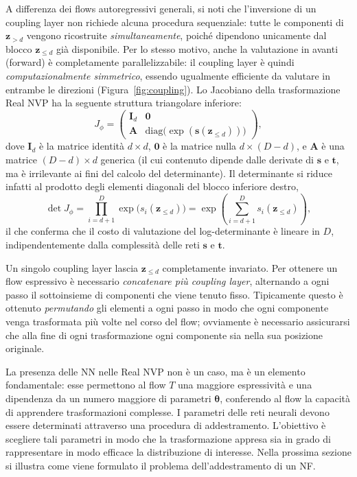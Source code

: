 A differenza dei flows autoregressivi generali, si noti che l'inversione di un coupling layer non richiede alcuna procedura sequenziale: tutte le componenti di $\mathbf{z}_{>d}$ vengono ricostruite \emph{simultaneamente}, poiché dipendono unicamente dal blocco $\mathbf{z}_{\leq d}$ già disponibile. Per lo stesso motivo, anche la valutazione in avanti (forward) è completamente parallelizzabile: il coupling layer è quindi \emph{computazionalmente simmetrico}, essendo ugualmente efficiente da valutare in entrambe le direzioni (Figura~\ref{fig:coupling}).
Lo Jacobiano della trasformazione Real NVP ha la seguente struttura triangolare inferiore:
\begin{equation}
    J_{\phi} =
    \begin{pmatrix}
        \mathbf{I}_d & \mathbf{0} \\
        \mathbf{A} & \mathrm{diag}\big(\exp(\mathbf{s}(\mathbf{z}_{\leq d}))\big)
    \end{pmatrix},
    \label{eq:coupling_jacobian}
\end{equation}
dove $\mathbf{I}_d$ è la matrice identità $d \times d$, $\mathbf{0}$ è la matrice nulla $d \times (D-d)$, e $\mathbf{A}$ è una matrice $(D-d) \times d$ generica (il cui contenuto dipende dalle derivate di $\mathbf{s}$ e $\mathbf{t}$, ma è irrilevante ai fini del calcolo del determinante). Il determinante si riduce infatti al prodotto degli elementi diagonali del blocco inferiore destro,
\begin{equation}
    \det J_{\phi} = \prod_{i=d+1}^{D} \exp\big(s_i(\mathbf{z}_{\leq d})\big) = \exp\left(\sum_{i=d+1}^{D} s_i(\mathbf{z}_{\leq d})\right),
\end{equation}
il che conferma che il costo di valutazione del log-determinante è lineare in $D$, indipendentemente dalla complessità delle reti $\mathbf{s}$ e $\mathbf{t}$.

Un singolo coupling layer lascia $\mathbf{z}_{\leq d}$ completamente invariato. Per ottenere un flow espressivo è necessario \emph{concatenare più coupling layer}, alternando a ogni passo il sottoinsieme di componenti che viene tenuto fisso. Tipicamente questo è ottenuto \emph{permutando} gli elementi a ogni passo in modo che ogni componente venga trasformata più volte nel corso del flow; ovviamente è necessario assicurarsi che alla fine di ogni trasformazione ogni componente sia nella sua posizione originale.

La presenza delle NN nelle Real NVP non è un caso, ma è un elemento fondamentale: esse permettono al flow $T$ una maggiore espressività e una dipendenza da un numero maggiore di parametri $\boldsymbol{\theta}$, conferendo al flow la capacità di apprendere trasformazioni complesse. I parametri delle reti neurali devono essere determinati attraverso una procedura di addestramento. L'obiettivo è scegliere tali parametri in modo che la trasformazione appresa sia in grado di rappresentare in modo efficace la distribuzione di interesse. Nella prossima sezione si illustra come viene formulato il problema dell'addestramento di un NF.

